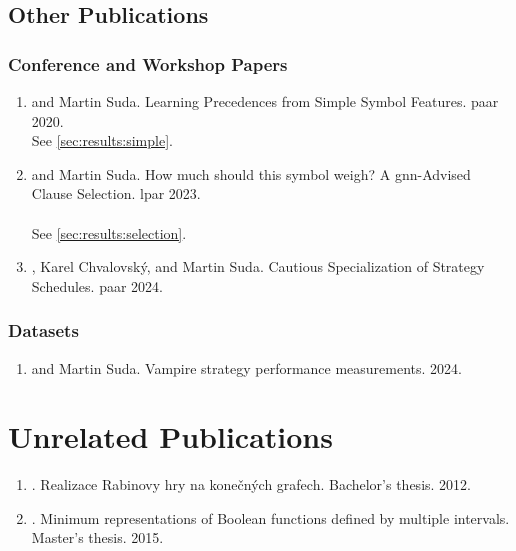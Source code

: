 \subsection{Other Publications}

\subsubsection{Conference and Workshop Papers}

\begin{enumerate}

\item {} and Martin Suda. Learning Precedences from Simple Symbol Features. \Gls{paar} 2020. \cite{DBLP:conf/cade/Bartek020}
\\
See \cref{sec:results:simple}.

\item {} and Martin Suda. How much should this symbol weigh? A \acrshort{gnn}-Advised Clause Selection. \Gls{lpar} 2023. \cite{DBLP:conf/lpar/Bartek023}
\\
\\
See \cref{sec:results:selection}.

\item {}, Karel Chvalovský, and Martin Suda. Cautious Specialization of Strategy Schedules. \Gls{paar} 2024. \cite{DBLP:conf/paar/BartekC024}

\end{enumerate}


\subsubsection{Datasets}

\begin{enumerate}
\item {} and Martin Suda. Vampire strategy performance measurements. 2024. \cite{bartek10814478}
\end{enumerate}

\section{Unrelated Publications}

\begin{enumerate}
\item {}. \foreignlanguage{czech}{Realizace Rabinovy hry na konečných grafech}. Bachelor's thesis. 2012. \cite{Bartek2012thesis}
\item {}. Minimum representations of Boolean functions defined by multiple intervals. Master's thesis. 2015. \cite{bartek2015}
\end{enumerate}

